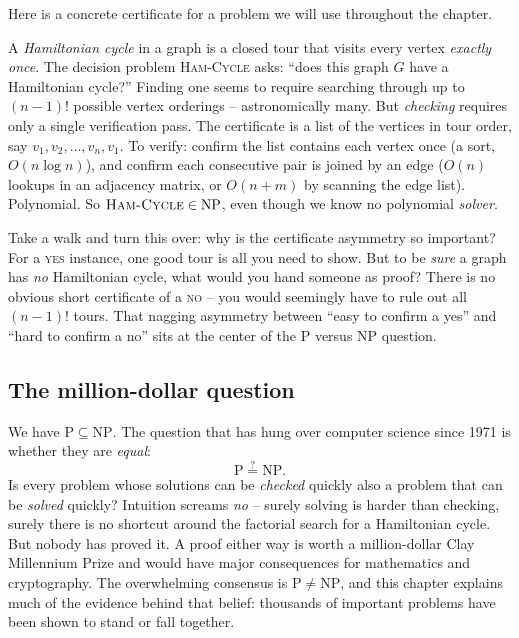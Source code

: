 Here is a concrete certificate for a problem we will use throughout the
chapter.

\begin{example}
\label{ch33:ham-in-np}
A \emph{Hamiltonian cycle} in a graph is a closed tour that visits every vertex
\emph{exactly once}. The decision problem \textsc{Ham-Cycle} asks: ``does this
graph $G$ have a Hamiltonian cycle?'' Finding one seems to require searching
through up to $(n-1)!$ possible vertex orderings -- astronomically many. But
\emph{checking} requires only a single verification pass. The certificate is
a list of the vertices in tour order, say $v_1, v_2, \dots, v_n, v_1$. To verify:
confirm the list contains each vertex once (a sort, $O(n\log n)$), and confirm
each consecutive pair is joined by an edge ($O(n)$ lookups in an adjacency matrix,
or $O(n + m)$ by scanning the edge list). Polynomial. So
$\textsc{Ham-Cycle}\in \mathrm{NP}$, even though we know no polynomial
\emph{solver}.
\end{example}

\begin{walkbox}
Take a walk and turn this over: why is the certificate asymmetry so important?
For a \textsc{yes} instance, one good tour is all you need to show. But to be
\emph{sure} a graph has \emph{no} Hamiltonian cycle, what would you hand someone
as proof? There is no obvious short certificate of a \textsc{no} -- you would
seemingly have to rule out all $(n-1)!$ tours. That nagging asymmetry between
``easy to confirm a yes'' and ``hard to confirm a no'' sits at the center of
the $\mathrm{P}$ versus $\mathrm{NP}$ question.
\end{walkbox}

\subsection{The million-dollar question}

We have $\mathrm{P} \subseteq \mathrm{NP}$. The question that has hung over
computer science since 1971 is whether they are \emph{equal}:
\[
  \mathrm{P} \overset{?}{=} \mathrm{NP}.
\]
Is every problem whose solutions can be \emph{checked} quickly also a problem
that can be \emph{solved} quickly? Intuition screams \emph{no} -- surely solving
is harder than checking, surely there is no shortcut around the factorial search
for a Hamiltonian cycle. But nobody has proved it. A proof either way is worth a
million-dollar Clay Millennium Prize and would have major consequences for
mathematics and cryptography. The overwhelming consensus is
$\mathrm{P} \ne \mathrm{NP}$, and this chapter explains much of the evidence
behind that belief: thousands of important problems have been shown to stand or
fall together.

